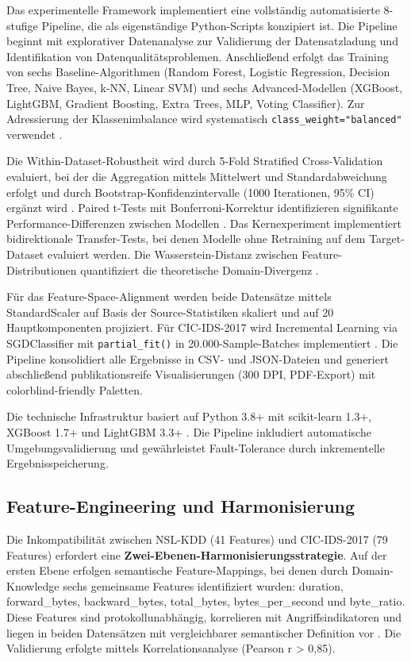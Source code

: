 \documentclass[11pt,a4paper]{article}
\begin{document}
    Das experimentelle Framework implementiert eine vollständig automatisierte 8-stufige Pipeline, die als eigenständige Python-Scripts konzipiert ist. Die Pipeline beginnt mit explorativer Datenanalyse zur Validierung der Datensatzladung und Identifikation von Datenqualitätsproblemen. Anschließend erfolgt das Training von sechs Baseline-Algorithmen (Random Forest, Logistic Regression, Decision Tree, Naive Bayes, k-NN, Linear SVM) und sechs Advanced-Modellen (XGBoost, LightGBM, Gradient Boosting, Extra Trees, MLP, Voting Classifier). Zur Adressierung der Klassenimbalance wird systematisch \texttt{class\_weight="balanced"} verwendet \parencite{Hastie2009,Vinayakumar2019}.

    Die Within-Dataset-Robustheit wird durch 5-Fold Stratified Cross-Validation evaluiert, bei der die Aggregation mittels Mittelwert und Standardabweichung erfolgt und durch Bootstrap-Konfidenzintervalle (1000 Iterationen, 95\% CI) ergänzt wird \parencite{Hastie2009}. Paired t-Tests mit Bonferroni-Korrektur identifizieren signifikante Performance-Differenzen zwischen Modellen \parencite{Hastie2009}. Das Kernexperiment implementiert bidirektionale Transfer-Tests, bei denen Modelle ohne Retraining auf dem Target-Dataset evaluiert werden. Die Wasserstein-Distanz zwischen Feature-Distributionen quantifiziert die theoretische Domain-Divergenz \parencite{Bishop2006}.

    Für das Feature-Space-Alignment werden beide Datensätze mittels StandardScaler auf Basis der Source-Statistiken skaliert und auf 20 Hauptkomponenten projiziert. Für CIC-IDS-2017 wird Incremental Learning via SGDClassifier mit \texttt{partial\_fit()} in 20.000-Sample-Batches implementiert \parencite{Bishop2006}. Die Pipeline konsolidiert alle Ergebnisse in CSV- und JSON-Dateien und generiert abschließend publikationsreife Visualisierungen (300 DPI, PDF-Export) mit colorblind-friendly Paletten.

    Die technische Infrastruktur basiert auf Python 3.8+ mit scikit-learn 1.3+, XGBoost 1.7+ und LightGBM 3.3+ \parencite{Weirauch2025}. Die Pipeline inkludiert automatische Umgebungsvalidierung und gewährleistet Fault-Tolerance durch inkrementelle Ergebnisspeicherung.

    \subsection{Feature-Engineering und Harmonisierung}

    Die Inkompatibilität zwischen NSL-KDD (41 Features) und CIC-IDS-2017 (79 Features) erfordert eine \textbf{Zwei-Ebenen-Harmonisierungsstrategie}. Auf der ersten Ebene erfolgen semantische Feature-Mappings, bei denen durch Domain-Knowledge sechs gemeinsame Features identifiziert wurden: duration, forward\_bytes, backward\_bytes, total\_bytes, bytes\_per\_second und byte\_ratio. Diese Features sind protokollunabhängig, korrelieren mit Angriffsindikatoren und liegen in beiden Datensätzen mit vergleichbarer semantischer Definition vor \parencite{Gharib2016}. Die Validierung erfolgte mittels Korrelationsanalyse (Pearson r > 0,85).
\end{document}
